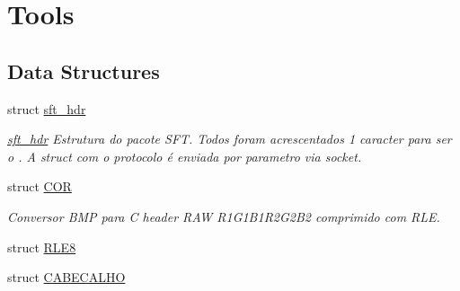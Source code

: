 \hypertarget{group__tools}{
\section{Tools}
\label{group__tools}
}
\subsection*{Data Structures}
\begin{DoxyCompactItemize}
\item 
struct \hyperlink{structsft__hdr}{sft\_\-hdr}
\begin{DoxyCompactList}\small\item\em \hyperlink{structsft__hdr}{sft\_\-hdr} Estrutura do pacote SFT. Todos foram acrescentados 1 caracter para ser o . A struct com o protocolo é enviada por parametro via socket. \item\end{DoxyCompactList}\item 
struct \hyperlink{structCOR}{COR}
\begin{DoxyCompactList}\small\item\em Conversor BMP para C header RAW R1G1B1R2G2B2 comprimido com RLE. \item\end{DoxyCompactList}\item 
struct \hyperlink{structRLE8}{RLE8}
\item 
struct \hyperlink{structCABECALHO}{CABECALHO}
\end{DoxyCompactItemize}
